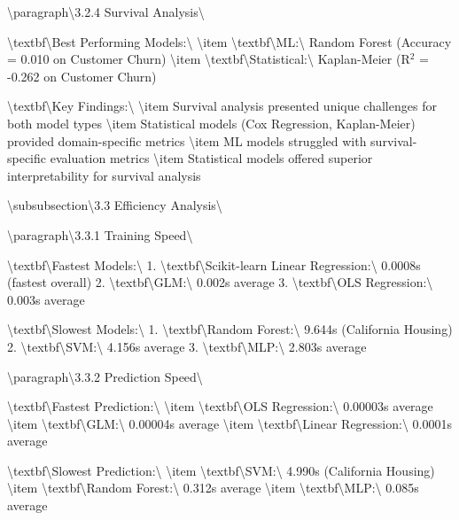 \documentclass[11pt,a4paper]{article}
\begin{document}
\textbackslash{}paragraph\textbackslash{}{3.2.4 Survival Analysis\textbackslash{}}

\textbackslash{}textbf\textbackslash{}{Best Performing Models:\textbackslash{}}
\textbackslash{}item \textbackslash{}textbf\textbackslash{}{ML:\textbackslash{}} Random Forest (Accuracy = 0.010 on Customer Churn)
\textbackslash{}item \textbackslash{}textbf\textbackslash{}{Statistical:\textbackslash{}} Kaplan-Meier (R$^2$ = -0.262 on Customer Churn)

\textbackslash{}textbf\textbackslash{}{Key Findings:\textbackslash{}}
\textbackslash{}item Survival analysis presented unique challenges for both model types
\textbackslash{}item Statistical models (Cox Regression, Kaplan-Meier) provided domain-specific metrics
\textbackslash{}item ML models struggled with survival-specific evaluation metrics
\textbackslash{}item Statistical models offered superior interpretability for survival analysis

\textbackslash{}subsubsection\textbackslash{}{3.3 Efficiency Analysis\textbackslash{}}

\textbackslash{}paragraph\textbackslash{}{3.3.1 Training Speed\textbackslash{}}

\textbackslash{}textbf\textbackslash{}{Fastest Models:\textbackslash{}}
1. \textbackslash{}textbf\textbackslash{}{Scikit-learn Linear Regression:\textbackslash{}} 0.0008s (fastest overall)
2. \textbackslash{}textbf\textbackslash{}{GLM:\textbackslash{}} 0.002s average
3. \textbackslash{}textbf\textbackslash{}{OLS Regression:\textbackslash{}} 0.003s average

\textbackslash{}textbf\textbackslash{}{Slowest Models:\textbackslash{}}
1. \textbackslash{}textbf\textbackslash{}{Random Forest:\textbackslash{}} 9.644s (California Housing)
2. \textbackslash{}textbf\textbackslash{}{SVM:\textbackslash{}} 4.156s average
3. \textbackslash{}textbf\textbackslash{}{MLP:\textbackslash{}} 2.803s average

\textbackslash{}paragraph\textbackslash{}{3.3.2 Prediction Speed\textbackslash{}}

\textbackslash{}textbf\textbackslash{}{Fastest Prediction:\textbackslash{}}
\textbackslash{}item \textbackslash{}textbf\textbackslash{}{OLS Regression:\textbackslash{}} 0.00003s average
\textbackslash{}item \textbackslash{}textbf\textbackslash{}{GLM:\textbackslash{}} 0.00004s average
\textbackslash{}item \textbackslash{}textbf\textbackslash{}{Linear Regression:\textbackslash{}} 0.0001s average

\textbackslash{}textbf\textbackslash{}{Slowest Prediction:\textbackslash{}}
\textbackslash{}item \textbackslash{}textbf\textbackslash{}{SVM:\textbackslash{}} 4.990s (California Housing)
\textbackslash{}item \textbackslash{}textbf\textbackslash{}{Random Forest:\textbackslash{}} 0.312s average
\textbackslash{}item \textbackslash{}textbf\textbackslash{}{MLP:\textbackslash{}} 0.085s average
\end{document}
